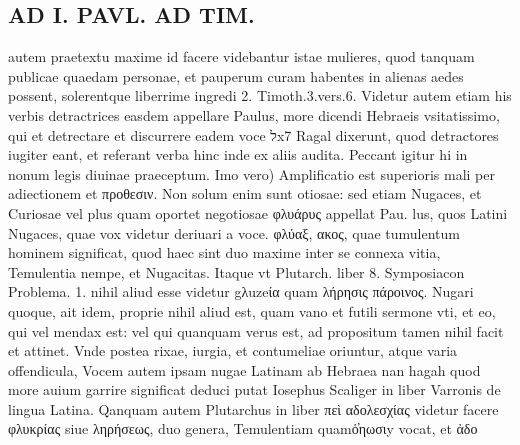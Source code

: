 \documentclass{article}
\begin{document}
\begin{pages}
\section*{AD I. PAVL. AD TIM. }
\marginpar{[ p.286 ]}\pstart autem praetextu maxime id facere videbantur istae mulieres, quod tanquam publicae quaedam personae, et pauperum curam habentes in alienas aedes possent, solerentque liberrime ingredi 2. Timoth.3.vers.6. Videtur autem etiam his verbis detractrices easdem appellare Paulus, more dicendi Hebraeis vsitatissimo, qui et detrectare et discurrere eadem voce לx7 Ragal dixerunt, quod detractores iugiter eant, et referant verba hinc inde ex aliis audita. Peccant igitur hi in nonum legis diuinae praeceptum.  \pend\pstart Imo vero) Amplificatio est superioris mali per adiectionem et προθεσιν. Non solum enim sunt otiosae: sed etiam Nugaces, et Curiosae vel plus quam oportet negotiosae φλυάρυς appellat Pau. lus, quos Latini Nugaces, quae vox videtur deriuari a voce. φλύαξ, ακος, quae tumulentum hominem significat, quod haec sint duo maxime inter se connexa vitia, Temulentia nempe, et Nugacitas. Itaque vt Plutarch. liber 8. Symposiacon Problema. 1. nihil aliud esse videtur gλuzeία quam λήρησις πάροινος. Nugari quoque, ait idem, proprie nihil aliud est, quam vano et futili sermone vti, et eo, qui vel mendax est: vel qui quanquam verus est, ad propositum tamen nihil facit et attinet. Vnde postea rixae, iurgia, et contumeliae oriuntur, atque varia offendicula, Vocem autem ipsam nugae Latinam ab Hebraea nan hagah quod more auium garrire significat deduci putat Iosephus Scaliger in liber  Varronis de lingua Latina. Qanquam autem Plutarchus in liber  πεὶ αδολεσχίας videtur facere φλυκρίας siue ληρήσεως, duo  \pend\pstart genera, Temulentiam quamὁ̓ηωσιy vocat, et ἀδο\pend

\end{pages}
\end{document}
